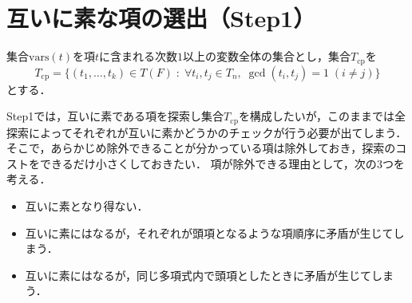 \section{互いに素な項の選出（Step1）}
集合$\mathrm{vars}(t)$を項$t$に含まれる次数$1$以上の変数全体の集合とし，集合$T_{\mathrm{cp}}$を
$$
T_{\mathrm{cp}} = \{ (t_1, \dots, t_k)\in T(F) \;:\; \forall t_i, t_j \in T_n, \; \gcd(t_i,  t_j)=1\; (i\ne j) \}
$$
とする．
\par
Step1では，互いに素である項を探索し集合$T_{\mathrm{cp}}$を構成したいが，このままでは全探索によってそれぞれが互いに素かどうかのチェックが行う必要が出てしまう．
そこで，あらかじめ除外できることが分かっている項は除外しておき，探索のコストをできるだけ小さくしておきたい．
項が除外できる理由として，次の$3$つを考える．
\begin{itemize}
	\item 互いに素となり得ない．
	\item 互いに素にはなるが，それぞれが頭項となるような項順序に矛盾が生じてしまう．
	\item 互いに素にはなるが，同じ多項式内で頭項としたときに矛盾が生じてしまう．
\end{itemize}
